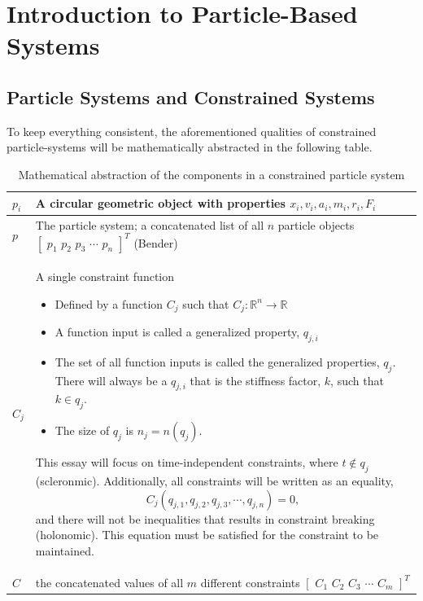 \documentclass[12pt, letterpaper]{article}
\begin{document}
\section{Introduction to Particle-Based Systems}

\subsection{Particle Systems and Constrained Systems}
\hspace{\parindent} To keep everything consistent, the aforementioned qualities of constrained particle-systems will be mathematically abstracted in the following table.
\def\arraystretch{2}%
\begin{table}[H]
\begin{tabular}{ | m{3em} | m{13.5cm}| }
  \hline
  $p_i$ & A circular geometric object with properties $x_{i}, v_{i}, a_{i}, m_{i}, r_{i}, F_{i}$ \\ 
  \hline
  $p$ & The particle system; a concatenated list of all $n$ particle objects $[\hspace{4pt}p_{1} \hspace{4pt} p_{2} \hspace{4pt} p_{3} \hspace{4pt} \cdots \hspace{4pt} p_{n}\hspace{4pt}] ^ {T}$ (Bender) \\ 
  \hline
  $C_j$ & A single constraint function
 \begin{itemize}
  \item Defined by a function $C_j$ such that $C_{j}: \mathbb{R}^{n}\rightarrow \mathbb{R}$
  \item A function input is called a generalized property, $q_{j,i}$
  \item The set of all function inputs is called the generalized properties, $q_j$. There will always be a $q_{j,i}$ that is the stiffness factor, $k$, such that $k \in q_j$.
  \item The size of $q_j$ is $n_{j} = n(q_{j})$.
\end{itemize}
This essay will focus on time-independent constraints, where $t \notin q_{j}$ (scleronmic). Additionally, all constraints will be written as an equality, $$C_{j}(q_{j,1},q_{j,2},q_{j,3},\cdots,q_{j,n}) = 0,$$ and there will not be inequalities that results in constraint breaking (holonomic). This equation must be satisfied for the constraint to be maintained.
\\
\hline
 $C$ & the concatenated values of all $m$ different constraints $[\hspace{4pt}C_{1} \hspace{4pt} C_{2} \hspace{4pt} C_{3} \hspace{4pt} \cdots \hspace{4pt} C_{m}\hspace{4pt}] ^ {T}$\\
 \hline
\end{tabular}
\centering
\caption{Mathematical abstraction of the components in a constrained particle system}
\label{table:table}
\end{table}
\end{document}
